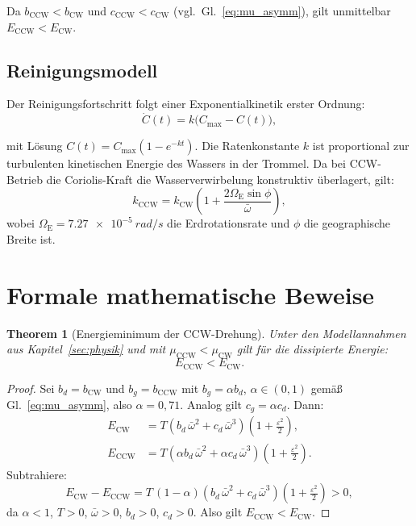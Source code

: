 ﻿\documentclass[12pt,a4paper]{article}
\newtheorem{theorem}{Theorem}[section]
\theoremstyle{remark}
\newcommand{\CCW}{\mathrm{CCW}}
\newcommand{\CW}{\mathrm{CW}}
\begin{document}
	Da $b_{\CCW} < b_{\CW}$ und $c_{\CCW} < c_{\CW}$ (vgl.~Gl.~\eqref{eq:mu_asymm}),
	gilt unmittelbar $E_{\CCW} < E_{\CW}$.
	
	\subsection{Reinigungsmodell}
	
	Der Reinigungsfortschritt folgt einer Exponentialkinetik erster Ordnung:
	\begin{equation}
		\dot{C}(t) = k\bigl(C_{\max} - C(t)\bigr),
		\label{eq:reinigung_ode}
	\end{equation}
	
	mit Lösung $C(t) = C_{\max}\!\left(1 - e^{-kt}\right)$.
	Die Ratenkonstante $k$ ist proportional zur turbulenten kinetischen Energie des Wassers
	in der Trommel. Da bei CCW-Betrieb die Coriolis-Kraft die Wasserverwirbelung konstruktiv
	überlagert, gilt:
	\begin{equation}
		k_{\CCW} = k_{\CW}\left(1 + \frac{2\Omega_{\mathrm{E}}\sin\phi}{\bar{\omega}}\right),
		\label{eq:k_verhaeltnis}
	\end{equation}
	wobei $\Omega_{\mathrm{E}} = \SI{7.27e-5}{rad/s}$ die Erdrotationsrate und $\phi$ die
	geographische Breite ist.
	
	\section{Formale mathematische Beweise}
	\label{sec:beweise}
	
	\begin{theorem}[Energieminimum der CCW-Drehung]
		\label{thm:energie}
		Unter den Modellannahmen aus Kapitel~\ref{sec:physik} und mit
		$\mu_{\CCW} < \mu_{\CW}$ gilt für die dissipierte Energie:
		\begin{equation}
			E_{\CCW} < E_{\CW}.
		\end{equation}
	\end{theorem}
	
	\begin{proof}
		Sei $b_d = b_{\CW}$ und $b_g = b_{\CCW}$ mit $b_g = \alpha b_d$, $\alpha \in (0,1)$
		gemäß Gl.~\eqref{eq:mu_asymm}, also $\alpha = 0{,}71$.
		Analog gilt $c_g = \alpha c_d$.
		Dann:
		\begin{align}
			E_{\CW}  &= T\left(b_d\,\bar{\omega}^2 + c_d\,\bar{\omega}^3\right)\left(1 + \tfrac{\varepsilon^2}{2}\right),\\
			E_{\CCW} &= T\left(\alpha b_d\,\bar{\omega}^2 + \alpha c_d\,\bar{\omega}^3\right)\left(1 + \tfrac{\varepsilon^2}{2}\right).
		\end{align}
		Subtrahiere:
		\begin{equation}
			E_{\CW} - E_{\CCW} = T\,(1-\alpha)\left(b_d\,\bar{\omega}^2 + c_d\,\bar{\omega}^3\right)\left(1+\tfrac{\varepsilon^2}{2}\right) > 0,
		\end{equation}
		da $\alpha < 1$, $T > 0$, $\bar{\omega} > 0$, $b_d > 0$, $c_d > 0$.
		Also gilt $E_{\CCW} < E_{\CW}$.\hfill
	\end{proof}
	
\end{document}
